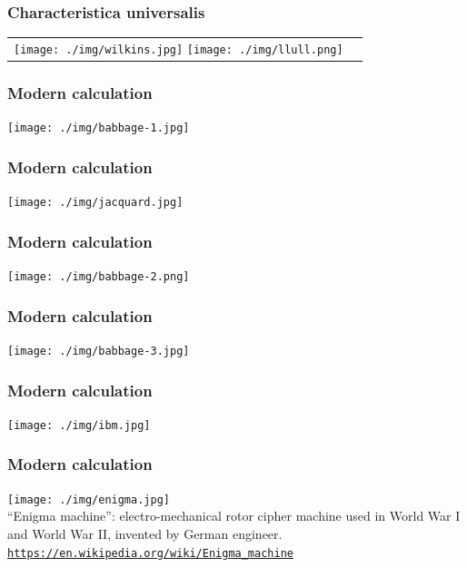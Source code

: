 \documentclass[11pt]{beamer}
\begin{document}
\begin{frame}[fragile]
  \frametitle{Characteristica universalis}

  \begin{tabular}{cc}
  \texttt{[image: ./img/wilkins.jpg]}
  \texttt{[image: ./img/llull.png]}
  \end{tabular}
\end{frame}

\begin{frame}[fragile]
  \frametitle{Modern calculation}

  \texttt{[image: ./img/babbage-1.jpg]}
\end{frame}

\begin{frame}[fragile]
  \frametitle{Modern calculation}

  \texttt{[image: ./img/jacquard.jpg]}
\end{frame}

\begin{frame}[fragile]
  \frametitle{Modern calculation}

  \texttt{[image: ./img/babbage-2.png]}
\end{frame}

\begin{frame}[fragile]
  \frametitle{Modern calculation}

  \texttt{[image: ./img/babbage-3.jpg]}
\end{frame}

\begin{frame}[fragile]
  \frametitle{Modern calculation}

  \texttt{[image: ./img/ibm.jpg]}


\end{frame}

\fi


\begin{frame}[fragile]
  \frametitle{Modern calculation}

  \texttt{[image: ./img/enigma.jpg]}\\
   {\small ``Enigma machine'': electro-mechanical rotor cipher machine used in World War I and World War II, invented by German engineer.}
     \textcolor{\CSBase}{\small \texttt{\url{https://en.wikipedia.org/wiki/Enigma\_machine}}}
\end{frame}
\end{document}
